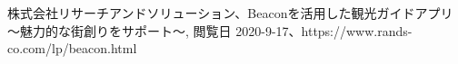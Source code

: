 
\begin{thebibliography}{9}
  株式会社リサーチアンドソリューション、Beaconを活用した観光ガイドアプリ～魅力的な街創りをサポート～,  閲覧日 2020-9-17、https://www.rands-co.com/lp/beacon.html
\end{thebibliography}
